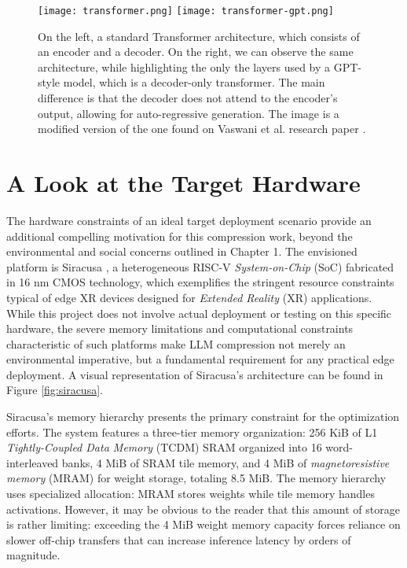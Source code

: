 \begin{figure}[htbp]
    \centering
    \texttt{[image: transformer.png]}
    \hfill
    \texttt{[image: transformer-gpt.png]}
    \caption[Transformer architectures comparison]{On the left, a standard Transformer architecture, which consists of an encoder and a decoder. On the right, we can observe the same architecture, while highlighting the only the layers used by a GPT-style model, which is a decoder-only transformer. The main difference is that the decoder does not attend to the encoder's output, allowing for auto-regressive generation. The image is a modified version of the one found on Vaswani et al. research paper \cite{attention_is_all_you_need}.}
    \label{fig:sidebyside}
\end{figure}

\section{A Look at the Target Hardware} \label{target_hardware}

The hardware constraints of an ideal target deployment scenario provide an additional compelling motivation for this compression work, beyond the environmental and social concerns outlined in Chapter 1. The envisioned platform is Siracusa \cite{target_hardware}, a heterogeneous RISC-V \textit{System-on-Chip} (SoC) fabricated in 16 nm CMOS technology, which exemplifies the stringent resource constraints typical of edge XR devices designed for \textit{Extended Reality} (XR) applications. While this project does not involve actual deployment or testing on this specific hardware, the severe memory limitations and computational constraints characteristic of such platforms make LLM compression not merely an environmental imperative, but a fundamental requirement for any practical edge deployment. A visual representation of Siracusa's architecture can be found in Figure \ref{fig:siracusa}.

Siracusa's memory hierarchy presents the primary constraint for the optimization efforts. The system features a three-tier memory organization: 256 KiB of L1 \textit{Tightly-Coupled Data Memory} (TCDM) SRAM organized into 16 word-interleaved banks, 4 MiB of SRAM tile memory, and 4 MiB of \textit{magnetoresistive memory} (MRAM) for weight storage, totaling 8.5 MiB. The memory hierarchy uses specialized allocation: MRAM stores weights while tile memory handles activations. However, it may be obvious to the reader that this amount of storage is rather limiting: exceeding the 4 MiB weight memory capacity forces reliance on slower off-chip transfers that can increase inference latency by orders of magnitude.

